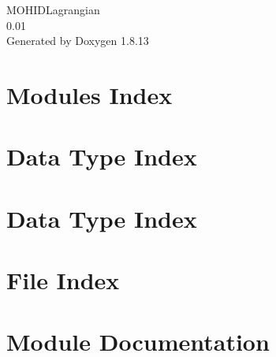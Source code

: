 \documentclass[twoside]{book}
\newcommand{\+}{\discretionary{\mbox{\scriptsize$\hookleftarrow$}}{}{}}
\newcommand{\clearemptydoublepage}{%
  \newpage{\pagestyle{empty}\cleardoublepage}%
}
\begin{document}
\hypersetup{pageanchor=false,
             bookmarksnumbered=true,
             pdfencoding=unicode
            }
\begin{titlepage}
\vspace*{7cm}
\begin{center}%
{\Large M\+O\+H\+I\+D\+Lagrangian \\[1ex]\large 0.\+01 }\\
\vspace*{1cm}
{\large Generated by Doxygen 1.8.13}\\
\end{center}
\end{titlepage}
\clearemptydoublepage
{}
\tableofcontents
\clearemptydoublepage
{}
\hypersetup{pageanchor=true}

\chapter{Modules Index}

\chapter{Data Type Index}

\chapter{Data Type Index}

\chapter{File Index}

\chapter{Module Documentation}
























\end{document}

